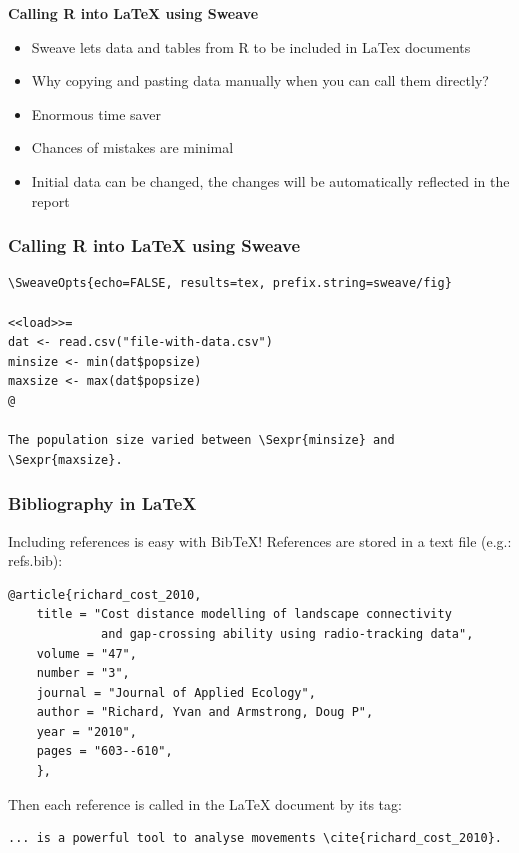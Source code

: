 \documentclass[9pt,xcolor=pdftex,dvipsnames,table]{beamer}
\begin{document}
\begin{frame}{\textbf{Calling R into LaTeX using Sweave}}
  \begin{itemize}
  \item Sweave lets data and tables from R to be included in LaTex documents
  \item Why copying and pasting data manually when you can call them directly?
  \item Enormous time saver
  \item Chances of mistakes are minimal
  \item Initial data can be changed, the changes will be automatically
    reflected in the report 
  \end{itemize}
\end{frame}


\begin{frame}[fragile] %
\frametitle{\textbf{Calling R into LaTeX using Sweave}}
\begin{example}[]
\begin{verbatim}
\SweaveOpts{echo=FALSE, results=tex, prefix.string=sweave/fig}

<<load>>=
dat <- read.csv("file-with-data.csv")
minsize <- min(dat$popsize)
maxsize <- max(dat$popsize)
@ 

The population size varied between \Sexpr{minsize} and \Sexpr{maxsize}.
\end{verbatim}
\end{example}
\end{frame}


\begin{frame}[fragile] %
\frametitle{\textbf{Bibliography in LaTeX}}
Including references is easy with BibTeX!
References are stored in a text file (e.g.: refs.bib):
\begin{verbatim}
@article{richard_cost_2010,
    title = "Cost distance modelling of landscape connectivity 
             and gap-crossing ability using radio-tracking data",
    volume = "47",
    number = "3",
    journal = "Journal of Applied Ecology",
    author = "Richard, Yvan and Armstrong, Doug P",
    year = "2010",
    pages = "603--610",
    },
\end{verbatim}
Then each reference is called in the LaTeX document by its tag:
\begin{verbatim}
... is a powerful tool to analyse movements \cite{richard_cost_2010}.
\end{verbatim}
\end{frame}
\end{document}
